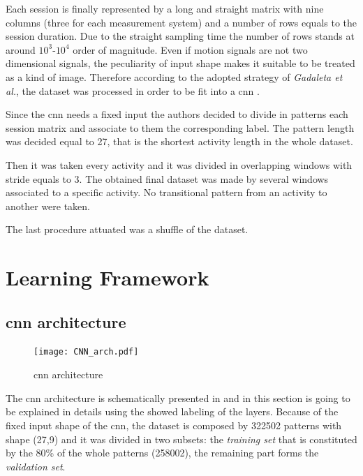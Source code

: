 Each session is finally represented by a long and straight matrix with nine columns (three for each measurement system) and a number of rows equals to the session duration. Due to the straight sampling time the number of rows stands at around $10^3$-$10^4$ order of magnitude. Even if motion signals are not two dimensional signals, the peculiarity of input shape makes it suitable to be treated as a kind of image. Therefore according to the adopted strategy of \textit{Gadaleta et al.}, the dataset was processed in order to be fit into a \gls{cnn} \cite{Gadaleta-2018}.


Since the \gls{cnn} needs a fixed input the authors decided to divide in patterns each session matrix and associate to them the corresponding label. The pattern length was decided equal to 27, that is the shortest activity length in the whole dataset. 

Then it was taken every activity and it was divided in overlapping windows with stride equals to 3. The obtained final dataset was made by several windows associated to a specific activity. No transitional pattern from an activity to another were taken. 


The last procedure attuated was a shuffle of the dataset.


\section{Learning Framework}
\label{sec:learning_framework}

\subsection{\gls{cnn} architecture}

\begin{figure}[htp]
\texttt{[image: CNN\_arch.pdf]}
\caption{\gls{cnn} architecture}
\label{fig:CNN}
\end{figure}



The \gls{cnn} architecture is schematically presented in  and in this section is going to be explained in details using the showed labeling of the layers. 
Because of the fixed input shape of the \gls{cnn}, the dataset is composed by 322502 patterns with shape (27,9) and it was divided in two subsets: the \textit{training set} that is constituted by the 80\% of the whole patterns (258002), the remaining part forms the \textit{validation set}.

